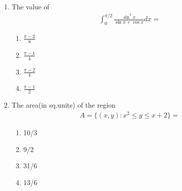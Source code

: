\begin{enumerate}[label=\arabic*.,ref=\thesubsection.\theenumi]
\item The value of
\begin{align*}
\int_{0}^{\pi/2}\frac{\sin^{3}x}{\sin x + \cos x}dx = 
\end{align*}
\begin{enumerate}
\item $\frac{\pi - 2}{8}$
\item $\frac{\pi - 1}{4}$
\item $\frac{\pi - 2}{4}$
\item $\frac{\pi - 1}{2}$
\end{enumerate}

\item The area(in sq.units) of the region
\begin{align*}
A = \{(x, y): x^2 \leq y \leq x + 2\} = 
\end{align*}
\begin{enumerate}
\item 10/3
\item 9/2
\item 31/6
\item 13/6
\end{enumerate}
\end{enumerate}








